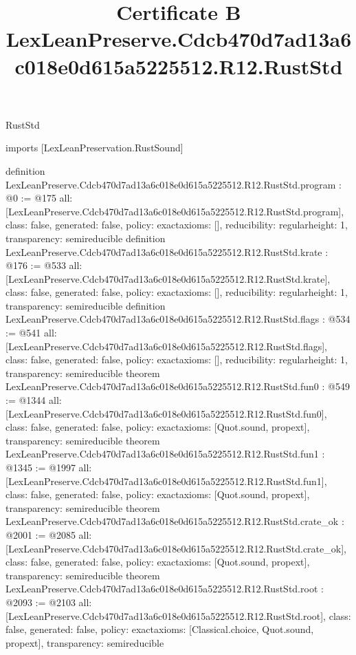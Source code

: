\begin{lexlean}{RustStd}
\title{Certificate B LexLeanPreserve.Cdcb470d7ad13a6c018e0d615a5225512.R12.RustStd}
\begin{coremodule}
imports [LexLeanPreservation.RustSound]

definition LexLeanPreserve.Cdcb470d7ad13a6c018e0d615a5225512.R12.RustStd.program : @0 := @175 {
  all: [LexLeanPreserve.Cdcb470d7ad13a6c018e0d615a5225512.R12.RustStd.program],
  class: false,
  generated: false,
  policy: exact{axioms: []},
  reducibility: regular{height: 1},
  transparency: semireducible
}
definition LexLeanPreserve.Cdcb470d7ad13a6c018e0d615a5225512.R12.RustStd.krate : @176 := @533 {
  all: [LexLeanPreserve.Cdcb470d7ad13a6c018e0d615a5225512.R12.RustStd.krate],
  class: false,
  generated: false,
  policy: exact{axioms: []},
  reducibility: regular{height: 1},
  transparency: semireducible
}
definition LexLeanPreserve.Cdcb470d7ad13a6c018e0d615a5225512.R12.RustStd.flags : @534 := @541 {
  all: [LexLeanPreserve.Cdcb470d7ad13a6c018e0d615a5225512.R12.RustStd.flags],
  class: false,
  generated: false,
  policy: exact{axioms: []},
  reducibility: regular{height: 1},
  transparency: semireducible
}
theorem LexLeanPreserve.Cdcb470d7ad13a6c018e0d615a5225512.R12.RustStd.fun0 : @549 := @1344 {
  all: [LexLeanPreserve.Cdcb470d7ad13a6c018e0d615a5225512.R12.RustStd.fun0],
  class: false,
  generated: false,
  policy: exact{axioms: [Quot.sound, propext]},
  transparency: semireducible
}
theorem LexLeanPreserve.Cdcb470d7ad13a6c018e0d615a5225512.R12.RustStd.fun1 : @1345 := @1997 {
  all: [LexLeanPreserve.Cdcb470d7ad13a6c018e0d615a5225512.R12.RustStd.fun1],
  class: false,
  generated: false,
  policy: exact{axioms: [Quot.sound, propext]},
  transparency: semireducible
}
theorem LexLeanPreserve.Cdcb470d7ad13a6c018e0d615a5225512.R12.RustStd.crate_ok : @2001 := @2085 {
  all: [LexLeanPreserve.Cdcb470d7ad13a6c018e0d615a5225512.R12.RustStd.crate_ok],
  class: false,
  generated: false,
  policy: exact{axioms: [Quot.sound, propext]},
  transparency: semireducible
}
theorem LexLeanPreserve.Cdcb470d7ad13a6c018e0d615a5225512.R12.RustStd.root : @2093 := @2103 {
  all: [LexLeanPreserve.Cdcb470d7ad13a6c018e0d615a5225512.R12.RustStd.root],
  class: false,
  generated: false,
  policy: exact{axioms: [Classical.choice, Quot.sound, propext]},
  transparency: semireducible
}


\end{coremodule}
\end{lexlean}
